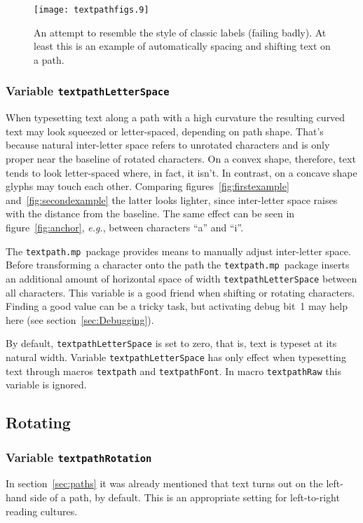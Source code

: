 \documentclass{article}
\newcommand*{\cmd}[1]{\texttt{#1}}
\newcommand*{\pkg}{\cmd{textpath.mp}}
\begin{document}
\begin{figure}
  \centering
  \texttt{[image: textpathfigs.9]}
  \caption{An attempt to resemble the style of classic labels (failing badly).  At least this is an example of automatically spacing and shifting text on a path.}
  \label{fig:textpathShift}
\end{figure}

\subsubsection{Variable \cmd{textpathLetterSpace}}
When typesetting text along a path with a high curvature the resulting curved text may look squeezed or letter-spaced, depending on path shape.  That's because natural inter-letter space refers to unrotated characters and is only proper near the baseline of rotated characters.  On a convex shape, therefore, text tends to look letter-spaced where, in fact, it isn't.  In contrast, on a concave shape glyphs may touch each other.  Comparing figures~\ref{fig:firstexample} and~\ref{fig:secondexample} the latter looks lighter, since inter-letter space raises with the distance from the baseline.  The same effect can be seen in figure~\ref{fig:anchor}, \emph{e.g.}, between characters ``a'' and ``i''.

The \pkg\ package provides means to manually adjust inter-letter space.  Before transforming a character onto the path the \pkg\ package inserts an additional amount of horizontal space of width \cmd{textpathLetterSpace} between all characters.  This variable is a good friend when shifting or rotating characters.  Finding a good value can be a tricky task, but activating debug bit~1 may help here (see section~\ref{sec:Debugging}).

By default, \cmd{textpathLetterSpace} is set to zero, that is, text is typeset at its natural width.  Variable \cmd{textpathLetterSpace} has only effect when typesetting text through macros \cmd{textpath} and \cmd{textpathFont}.  In macro \cmd{textpathRaw} this variable is ignored.


\subsection{Rotating}\label{sec:Rotating}

\subsubsection{Variable \cmd{textpathRotation}}
In section~\ref{sec:paths} it was already mentioned that text turns out on the left-hand side of a path, by default.  This is an appropriate setting for left-to-right reading cultures.
\end{document}
